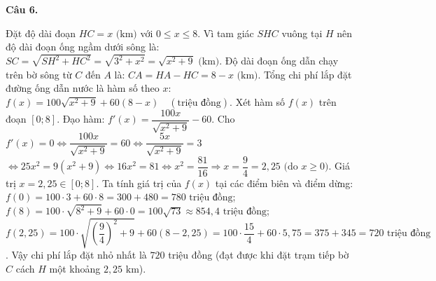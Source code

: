 \documentclass[12pt,a4paper]{article}
\newcommand{\loigiai}[1]{\par\medskip\Needspace{4\baselineskip}\noindent\textbf{#1}\par\nobreak}
\begin{document}
\loigiai{Câu 6.}
Đặt độ dài đoạn $HC=x\text{ (km)}$ với $0\le x\le 8$.
Vì tam giác $SHC$ vuông tại $H$ nên độ dài đoạn ống ngầm dưới sông là:
$SC=\sqrt{SH^2+HC^2}=\sqrt{3^2+x^2}=\sqrt{x^2+9}\text{ (km)}$.
Độ dài đoạn ống dẫn chạy trên bờ sông từ $C$ đến $A$ là:
$CA=HA-HC=8-x\text{ (km)}$.
Tổng chi phí lắp đặt đường ống dẫn nước là hàm số theo $x$:
$f(x)=100\sqrt{x^2+9}+60(8-x)\quad (\text{triệu đồng})$.
Xét hàm số $f(x)$ trên đoạn $[0;8]$. Đạo hàm:
$f'(x)=\dfrac{100x}{\sqrt{x^2+9}}-60$.
Cho $f'(x)=0\Leftrightarrow \dfrac{100x}{\sqrt{x^2+9}}=60\Leftrightarrow \dfrac{5x}{\sqrt{x^2+9}}=3$
$\Leftrightarrow 25x^2=9(x^2+9)\Leftrightarrow 16x^2=81\Leftrightarrow x^2=\dfrac{81}{16}\Rightarrow x=\dfrac{9}{4}=2{,}25\text{ (do } x\ge 0\text{)}$.
Giá trị $x=2{,}25\in[0;8]$.
Ta tính giá trị của $f(x)$ tại các điểm biên và điểm dừng:
$f(0)=100\cdot 3+60\cdot 8=300+480=780\text{ triệu đồng}$;
$f(8)=100\cdot\sqrt{8^2+9}+60\cdot 0=100\sqrt{73}\approx 854{,}4\text{ triệu đồng}$;
$f(2{,}25)=100\cdot\sqrt{\left(\dfrac{9}{4}\right)^2+9}+60(8-2{,}25)=100\cdot\dfrac{15}{4}+60\cdot 5{,}75=375+345=720\text{ triệu đồng}$.
Vậy chi phí lắp đặt nhỏ nhất là $720$ triệu đồng (đạt được khi đặt trạm tiếp bờ $C$ cách $H$ một khoảng $2{,}25\text{ km}$).
\end{document}
